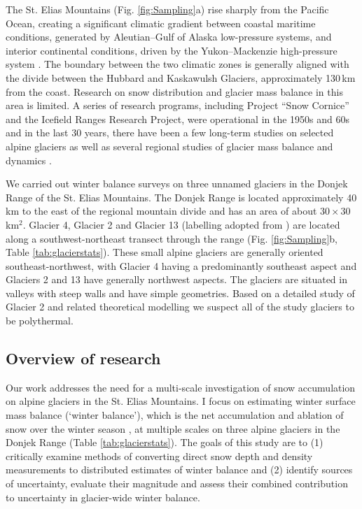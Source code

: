 \documentclass{sfuthesis}
\begin{document}
The St. Elias Mountains (Fig. \ref{fig:Sampling}a) rise sharply from the Pacific Ocean, creating a significant climatic gradient between coastal maritime conditions, generated by Aleutian--Gulf of Alaska low-pressure systems, and interior continental conditions, driven by the Yukon--Mackenzie high-pressure system \citep{Taylor1969}. The boundary between the two climatic zones is generally aligned with the divide between the Hubbard and Kaskawulsh Glaciers, approximately 130\,km from the coast. Research on snow distribution and glacier mass balance in this area is limited. A series of research programs, including Project ``Snow Cornice''  and the Icefield Ranges Research Project, were operational in the 1950s and 60s \citep{Wood1948, Danby2003} and in the last 30 years, there have been a few long-term studies on selected alpine glaciers \citep[e.g.][]{Clarke2014} as well as several regional studies of glacier mass balance and dynamics \citep[e.g.][]{Arendt2008, Burgess2013,Waechter2015}.

We carried out winter balance surveys on three unnamed glaciers in the Donjek Range of the St. Elias Mountains. The Donjek Range is located approximately 40 km to the east of the regional mountain divide and has an area of about $30\times30$\,km$^2$. Glacier 4, Glacier 2 and Glacier 13 (labelling adopted from \cite{Crompton2016}) are located along a southwest-northeast transect through the range (Fig. \ref{fig:Sampling}b, Table \ref{tab:glacierstats}). These small alpine glaciers are generally oriented southeast-northwest, with Glacier 4 having a predominantly southeast aspect and Glaciers 2 and 13 have generally northwest aspects. The glaciers are situated in valleys with steep walls and have simple geometries. Based on a detailed study of Glacier 2  \citep{Wilson2013} and related theoretical modelling \citep{Wilson2013a} we suspect all of the study glaciers to be polythermal. 


\subsection{Overview of research}
Our work addresses the need for a multi-scale investigation of snow accumulation on alpine glaciers in the St. Elias Mountains. I focus on estimating winter surface mass balance (`winter balance'), which is the net accumulation and ablation of snow over the winter season \citep{Cogley2011}, at multiple scales on three alpine glaciers in the Donjek Range (Table \ref{tab:glacierstats}). The goals of this study are to (1) critically examine methods of converting direct snow depth and density measurements to distributed estimates of winter balance and (2) identify sources of uncertainty, evaluate their magnitude and assess their combined contribution to uncertainty in glacier-wide winter balance. 
\end{document}
